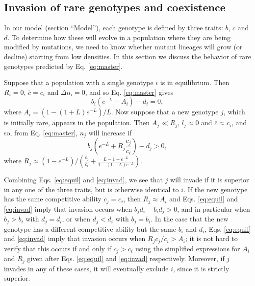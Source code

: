 \documentclass[11pt]{article}
\begin{document}

\subsection*{Invasion of rare genotypes and coexistence}\label{sec:invas}

In our model (section ``Model''), each genotype is defined by three traits: $b$, $c$ and $d$. To determine how these will evolve in a population where they are being modified by mutations, we need to know whether mutant lineages will grow (or decline) starting from low densities. In this section we discuss the behavior of rare genotypes predicted by Eq. \eqref{eq:master}. 

Suppose that a population with a single genotype $i$ is in equilibrium. Then $R_i=0$, $\overline{c}=c_i$ and $\Delta n_i = 0$, and so Eq. \eqref{eq:master} gives
\begin{equation}
b_i\left(e^{-L}+A_i\right)-d_i=0,\label{eq:equil}
\end{equation}
where $A_i=(1-(1+L)e^{-L})/L$. Now suppose that a new genotype $j$, which is initially rare, appears in the population. Then $A_j\ll R_j$, $l_j\approx 0$ and $\overline{c}\approx c_i$, and so, from Eq. \eqref{eq:master}, $n_j$ will increase if 
\begin{equation}
b_j \left(e^{-L}+R_j\frac{c_j}{c_i}\right)-d_j>0,\label{eq:invad}
\end{equation}
where $R_j\approx (1-e^{-L})/\left(\frac{c_j}{c_i}+\frac{L-1-e^{-L}}{1-(1+L)e^{-L}}\right)$. 

Combining Eqs. \eqref{eq:equil} and \eqref{eq:invad}, we see that $j$ will invade if it is superior in any one of the three traits, but is otherwise identical to $i$. If the new genotype has the same competitive ability $c_j=c_i$, then $R_j\approx A_i$ and Eqs. \eqref{eq:equil} and \eqref{eq:invad} imply that invasion occurs when $b_jd_i-b_id_j>0$, and in particular when $b_j>b_i$ with $d_j=d_i$, or when $d_j<d_i$ with $b_j=b_i$. In the case that the new genotype has a different competitive ability but the same $b_i$ and $d_i$, Eqs. \eqref{eq:equil} and \eqref{eq:invad} imply that invasion occurs when $R_j c_j/c_i > A_i$; it is not hard to verify that this occurs if and only if $c_j>c_i$ using the simplified expressions for $A_i$ and $R_j$ given after Eqs. \eqref{eq:equil} and \eqref{eq:invad} respectively. Moreover, if $j$ invades in any of these cases, it will eventually exclude $i$, since it is strictly superior. 
\end{document}
